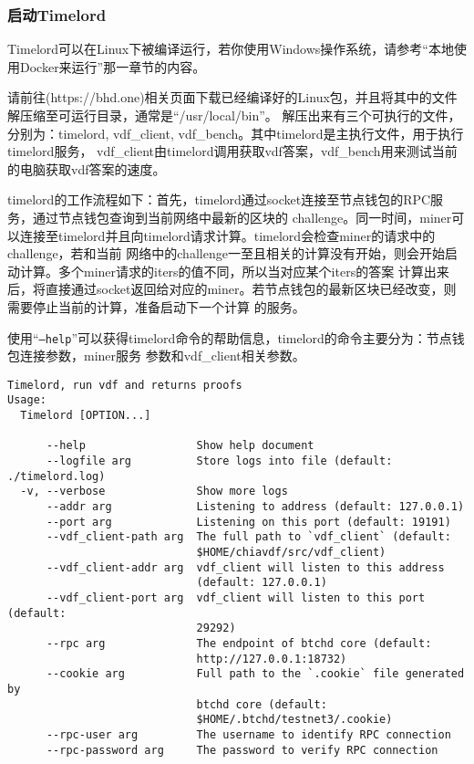 \subsubsection{启动Timelord}
\begin{flushleft}
    Timelord可以在Linux下被编译运行，若你使用Windows操作系统，请参考``本地使用Docker来运行''那一章节的内容。
\end{flushleft}
\begin{flushleft}
    请前往(https://bhd.one)相关页面下载已经编译好的Linux包，并且将其中的文件解压缩至可运行目录，通常是``/usr/local/bin''。
    解压出来有三个可执行的文件，分别为：timelord, vdf\_client, vdf\_bench。其中timelord是主执行文件，用于执行timelord服务，
    vdf\_client由timelord调用获取vdf答案，vdf\_bench用来测试当前的电脑获取vdf答案的速度。
\end{flushleft}
\begin{flushleft}
    timelord的工作流程如下：首先，timelord通过socket连接至节点钱包的RPC服务，通过节点钱包查询到当前网络中最新的区块的
    challenge。同一时间，miner可以连接至timelord并且向timelord请求计算。timelord会检查miner的请求中的challenge，若和当前
    网络中的challenge一至且相关的计算没有开始，则会开始启动计算。多个miner请求的iters的值不同，所以当对应某个iters的答案
    计算出来后，将直接通过socket返回给对应的miner。若节点钱包的最新区块已经改变，则需要停止当前的计算，准备启动下一个计算
    的服务。
\end{flushleft}
\begin{flushleft}
    使用``\texttt{--help}''可以获得timelord命令的帮助信息，timelord的命令主要分为：节点钱包连接参数，miner服务
    参数和vdf\_client相关参数。
\end{flushleft}
\scriptsize
\begin{verbatim}
Timelord, run vdf and returns proofs
Usage:
  Timelord [OPTION...]

      --help                 Show help document
      --logfile arg          Store logs into file (default: ./timelord.log)
  -v, --verbose              Show more logs
      --addr arg             Listening to address (default: 127.0.0.1)
      --port arg             Listening on this port (default: 19191)
      --vdf_client-path arg  The full path to `vdf_client` (default:
                             $HOME/chiavdf/src/vdf_client)
      --vdf_client-addr arg  vdf_client will listen to this address
                             (default: 127.0.0.1)
      --vdf_client-port arg  vdf_client will listen to this port (default:
                             29292)
      --rpc arg              The endpoint of btchd core (default:
                             http://127.0.0.1:18732)
      --cookie arg           Full path to the `.cookie` file generated by
                             btchd core (default:
                             $HOME/.btchd/testnet3/.cookie)
      --rpc-user arg         The username to identify RPC connection
      --rpc-password arg     The password to verify RPC connection
\end{verbatim}
